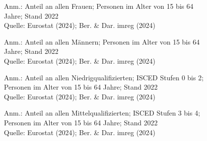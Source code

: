 \begin{figure}[p]
	{\centering {}}
	\label{map:erwerbfrauen}
	\begin{spacing}{1} \scriptsize
		Anm.: Anteil an allen Frauen; Personen im Alter von 15 bis 64 Jahre; Stand 2022\\
		Quelle: Eurostat (2024); Ber. \& Dar. imreg (2024) \end{spacing}
\end{figure}


\begin{figure}[p]
	{\centering {}}
	\label{map:erwerbmaenner}
	\begin{spacing}{1} \scriptsize
		Anm.: Anteil an allen Männern; Personen im Alter von 15 bis 64 Jahre; Stand 2022\\
		Quelle: Eurostat (2024); Ber. \& Dar. imreg (2024) \end{spacing}
\end{figure}


\begin{figure}[p]
	{\centering {}}
	\label{map:erwerbniedrig}
	\begin{spacing}{1} \scriptsize
		Anm.: Anteil an allen Niedrigqualifizierten; ISCED Stufen 0 bis 2; Personen im Alter von 15 bis 64 Jahre; Stand 2022\\
		Quelle: Eurostat (2024); Ber. \& Dar. imreg (2024) \end{spacing}
\end{figure}


\begin{figure}[p]
	{\centering {}}
	\label{map:erwerbmittel}
	\begin{spacing}{1} \scriptsize
		Anm.: Anteil an allen Mittelqualifizierten; ISCED Stufen 3 bis 4; Personen im Alter von 15 bis 64 Jahre; Stand 2022\\
		Quelle: Eurostat (2024); Ber. \& Dar. imreg (2024) \end{spacing}
\end{figure}

